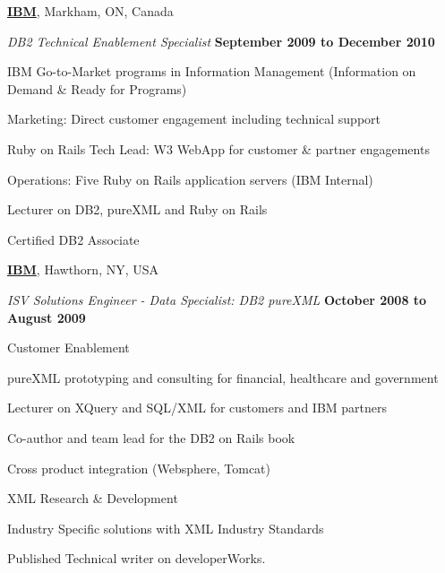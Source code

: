 \documentclass[10pt]{article}
\newenvironment{outerlist}[1][\enskip\textbullet]%
        {\begin{enumerate}[#1]}{\end{enumerate}%
         \vspace{-.6\baselineskip}}
\newenvironment{innerlist}[1][\enskip\textbullet]%
        {\begin{compactenum}[#1]}{\end{compactenum}}
\newcommand{\blankline}{\quad\pagebreak[2]}
\begin{document}
\blankline

\href{http://www.ibm.com/}{\textbf{IBM}}, 
Markham, ON, Canada
\begin{outerlist}

  \item[] \textit{DB2 Technical Enablement Specialist}%
          \hfill \textbf{September 2009 to December 2010}
  \begin{innerlist}
\item IBM Go-to-Market programs in Information Management (Information on Demand \& Ready for Programs)
\item Marketing: Direct customer engagement including technical support
\item Ruby on Rails Tech Lead: W3 WebApp for customer \& partner engagements
\item Operations: Five Ruby on Rails application servers (IBM Internal)
\item Lecturer on DB2, pureXML and Ruby on Rails
\item Certified DB2 Associate
  \end{innerlist}

\end{outerlist}

\blankline

\href{http://www.ibm.com/}{\textbf{IBM}}, 
Hawthorn, NY, USA
\begin{outerlist}

  \item[] \textit{ISV Solutions Engineer - Data Specialist: DB2 pureXML}%
          \hfill \textbf{October 2008 to August 2009}
  \begin{innerlist}
\item Customer Enablement
\item pureXML prototyping and consulting for financial, healthcare and government
\item Lecturer on XQuery and SQL/XML for customers and IBM partners
\item Co-author and team lead for the DB2 on Rails book
\item Cross product integration (Websphere, Tomcat)
\item XML Research \& Development
\item Industry Specific solutions with XML Industry Standards
\item Published Technical writer on developerWorks.
  \end{innerlist}

\end{outerlist}
\end{document}
